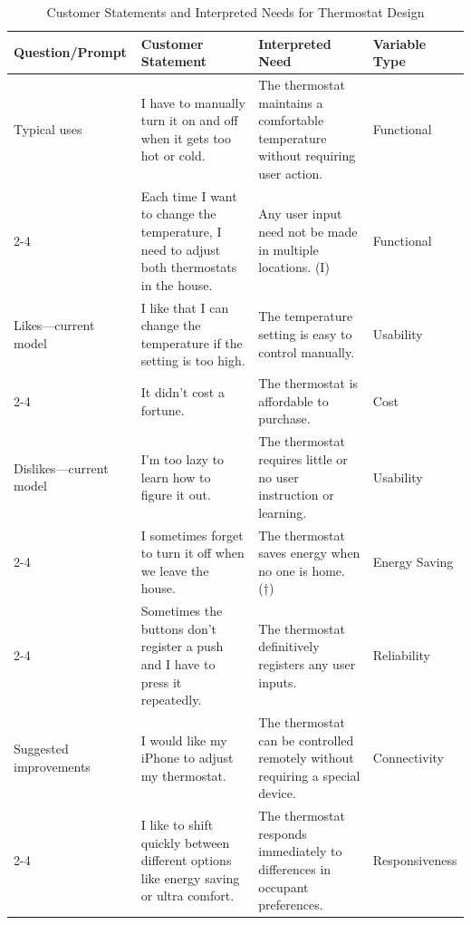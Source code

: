 

\begin{table}[h!]
\footnotesize
\centering
\caption{Customer Statements and Interpreted Needs for Thermostat Design}
\label{tab:interpreted_needs}
\begin{tabular}{|p{2.5cm}|p{5cm}|p{5cm}|p{2.5cm}|}
\hline
\textbf{Question/Prompt} & \textbf{Customer Statement} & \textbf{Interpreted Need} & \textbf{Variable Type} \\
\hline
Typical uses & I have to manually turn it on and off when it gets too hot or cold. & The thermostat maintains a comfortable temperature without requiring user action. & Functional \\
\cline{2-4}
& Each time I want to change the temperature, I need to adjust both thermostats in the house. & Any user input need not be made in multiple locations. (I) & Functional \\
\hline
Likes—current model & I like that I can change the temperature if the setting is too high. & The temperature setting is easy to control manually. & Usability \\
\cline{2-4}
& It didn’t cost a fortune. & The thermostat is affordable to purchase. & Cost \\
\hline
Dislikes—current model & I’m too lazy to learn how to figure it out. & The thermostat requires little or no user instruction or learning. & Usability \\
\cline{2-4}
& I sometimes forget to turn it off when we leave the house. & The thermostat saves energy when no one is home. (†) & Energy Saving \\
\cline{2-4}
& Sometimes the buttons don’t register a push and I have to press it repeatedly. & The thermostat definitively registers any user inputs. & Reliability \\
\hline
Suggested improvements & I would like my iPhone to adjust my thermostat. & The thermostat can be controlled remotely without requiring a special device. & Connectivity \\
\cline{2-4}
& I like to shift quickly between different options like energy saving or ultra comfort. & The thermostat responds immediately to differences in occupant preferences. & Responsiveness \\
\hline
\end{tabular}
\end{table}